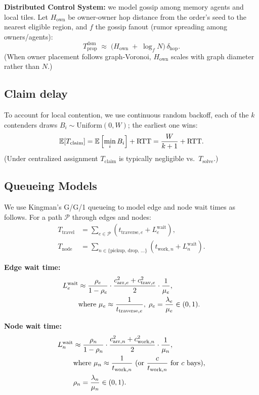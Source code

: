 \noindent\textbf{Distributed Control System:} we model gossip among memory agents and local tiles. Let $H_{\text{own}}$ be owner-owner hop distance from the order's seed to the nearest eligible region, and $f$ the gossip fanout (rumor spreading among owners/agents):
\begin{equation}
  T_{\text{prop}}^{\text{dsm}}
  \;\approx\;
  \big(H_{\text{own}} \;+\; \log_f N\big)\,\delta_{\text{hop}}.
  \label{eq:dsm-prop}
\end{equation}
(When owner placement follows graph-Voronoi, $H_{\text{own}}$ scales with graph diameter rather than $N$.)

\subsection*{Claim delay}
To account for local contention, we use continuous random backoff, each of the $k$ contenders draws $B_i \sim \text{Uniform}(0,W)$; the earliest one wins:
\begin{equation}
  \mathbb{E}[T_{\text{claim}}] = \mathbb{E}\left[\min_i B_i\right] + \text{RTT} = \frac{W}{k+1} + \text{RTT}.
\end{equation}
(Under centralized assignment $T_{\text{claim}}$ is typically negligible vs.\ $T_{\text{solve}}$.)

\subsection*{Queueing Models}
We use Kingman's G/G/1 queueing to model edge and node wait times as follows.
For a path $\mathcal{P}$ through edges and nodes:
\begin{align}
  T_{\text{travel}} & = \sum_{e \in \mathcal{P}} \left( t_{\text{traverse},e} + L_{e}^{\text{wait}} \right),              \\
  T_{\text{node}}   & = \sum_{n \in \{\text{pickup, drop, ...}\}} \left( t_{\text{work},n} + L_{n}^{\text{wait}} \right).
\end{align}

\noindent\textbf{Edge wait time:}
\begin{align}
  L_{e}^{\text{wait}} & \approx \frac{\rho_e}{1-\rho_e} \cdot \frac{c_{\text{arr},e}^2 + c_{\text{trav},e}^2}{2} \cdot \frac{1}{\mu_e}, \notag \\
                      & \text{where } \mu_e \approx \frac{1}{t_{\text{traverse},e}}, \; \rho_e = \frac{\lambda_e}{\mu_e} \in (0,1).
\end{align}

\noindent\textbf{Node wait time:}
\begin{align}
  L_{n}^{\text{wait}} & \approx \frac{\rho_n}{1-\rho_n} \cdot \frac{c_{\text{arr},n}^2 + c_{\text{work},n}^2}{2} \cdot \frac{1}{\mu_n}, \notag                \\
                      & \text{where } \mu_n \approx \frac{1}{t_{\text{work},n}} \text{ (or } \frac{c}{t_{\text{work},n}} \text{ for } c \text{ bays)}, \notag \\
                      & \rho_n = \frac{\lambda_n}{\mu_n} \in (0,1).
\end{align}

